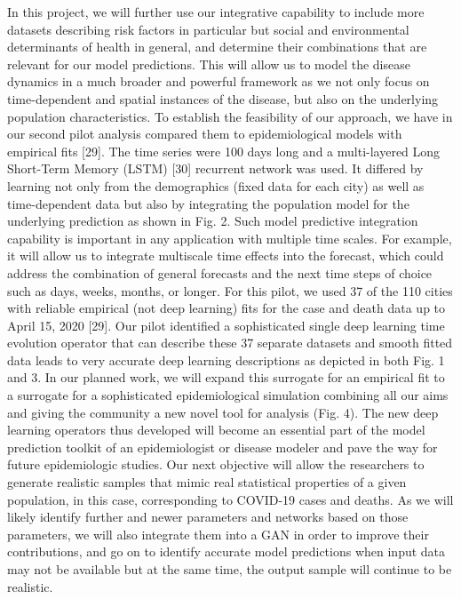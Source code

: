 In this project, we will further use our integrative capability to include more datasets describing risk factors in particular but social and environmental determinants of health in general, and determine their combinations that are relevant for our model predictions. This will allow us to model the disease dynamics in a much broader and powerful framework as we not only focus on time-dependent and spatial instances of the disease, but also on the underlying population characteristics. To establish the feasibility of our approach, we have in our second pilot analysis compared them to epidemiological models with empirical fits [29]. The time series were 100 days long and a multi-layered Long Short-Term Memory (LSTM) [30] recurrent network was used. It differed by learning not only from the demographics (fixed data for each city) as well as time-dependent data but also by integrating the population model for the underlying prediction as shown in Fig. 2. Such model predictive integration capability is important in any application with multiple time scales. For example, it will allow us to integrate multiscale time effects into the forecast, which could address the combination of general forecasts and the next time steps of choice such as days, weeks, months, or longer. For this pilot, we used 37 of the 110 cities with reliable empirical (not deep learning) fits for the case and death data up to April 15, 2020 [29]. Our pilot identified a sophisticated single deep learning time evolution operator that can describe these 37  separate datasets and smooth fitted data leads to very accurate deep learning descriptions as depicted in both Fig. 1 and 3. In our planned work, we will expand this surrogate for an empirical fit to a surrogate for a sophisticated epidemiological simulation combining all our aims and giving the community a new novel tool for analysis (Fig. 4). The new deep learning operators thus developed will become an essential part of the model prediction toolkit of an epidemiologist or disease modeler and pave the way for future epidemiologic studies. 
Our next objective will allow the researchers to generate realistic samples that mimic real statistical properties of a given population, in this case, corresponding to COVID-19 cases and deaths. As we will likely identify further and newer parameters and networks based on those parameters, we will also integrate them into a GAN in order to improve their contributions, and go on to identify accurate model predictions when input data may not be available but at the same time, the output sample will continue to be realistic. 

